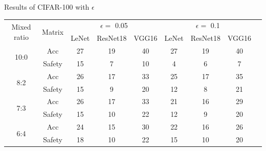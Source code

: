 \documentclass[journal,article,submit,moreauthors,pdftex]{Definitions/mdpi}
\begin{document}
\begin{specialtable}[H]
    \centering
    \caption{Results of CIFAR-100 with \begin{math}\epsilon\end{math}}
    \label{cifar100-results}
    {\small
    \begin{tabular}{|c|c|c|c|c|c|c|c|c|}
    \hline
    \multirow{2}{*}{Mixed ratio} & \multirow{2}{*}{Matrix} & \multicolumn{3}{c|}{\begin{math}\epsilon=\end{math} 0.05}  & \multicolumn{3}{c|}{\begin{math}\epsilon=\end{math} 0.1}       \\ \cline{3-8}
                                 &                           & LeNet               & ResNet18              & VGG16       & LeNet              & ResNet18              & VGG16              \\ \hline 
    \multirow{2}{*}{10:0}        & Acc                       & 27                  & 19                    & 40          & 27                 & 19                    & 40                 \\ \cline{2-8} 
                                 & Safety                    & 15                  & 7                     & 10          & 4                  & 6                     & 7                  \\ \hline 
    \multirow{2}{*}{8:2}         & Acc                       & 26                  & 17                    & 33          & 25                 & 17                    & 35                 \\ \cline{2-8} 
                                 & Safety                    & 15                  & 9                     & 20          & 12                 & 8                     & 21                 \\ \hline 
    \multirow{2}{*}{7:3}         & Acc                       & 26                  & 17                    & 33          & 21                 & 16                    & 29                 \\ \cline{2-8} 
                                 & Safety                    & 15                  & 10                    & 22          & 12                 & 9                     & 20                 \\ \hline 
    \multirow{2}{*}{6:4}         & Acc                       & 24                  & 15                    & 30          & 22                 & 16                    & 26                 \\ \cline{2-8} 
                                 & Safety                    & 18                  & 10                    & 22          & 15                 & 10                    & 20                 \\ \hline 
    \end{tabular}
    }
\end{specialtable}
\end{document}
